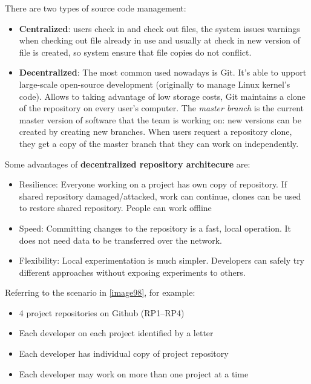 \documentclass[10pt,a4paper]{report}
\begin{document}
There are two types of source code management:
\begin{itemize}
	\item \textbf{Centralized}: users check in and check out files, the system issues warnings when checking out file already in use and usually at check in new version of file is created, so system ensure that file copies do not conflict.
	\item \textbf{Decentralized}: The most common used nowadays is Git. It's able to upport large-scale open-source development (originally to manage Linux kernel’s code). Allows to taking advantage of low storage costs, Git maintains a clone of the repository on every user’s computer.
	The \textit{master branch} is the current master version of software that the team is working on: new versions can be created by creating new branches. When users request a repository clone, they get a
	copy of the master branch that they can work on independently.
\end{itemize}
Some advantages of \textbf{decentralized repository architecure} are:
\begin{itemize}
	\item Resilience: Everyone working on a project has own copy of repository. If shared repository damaged/attacked, work can continue, clones can	be used to restore shared repository. People can work offline
	\item Speed: Committing changes to the repository is a fast, local operation. It does not need data to be transferred over the network.
	\item Flexibility: Local experimentation is much simpler. Developers can safely try different approaches without exposing experiments to others.
\end{itemize}
Referring to the scenario in \ref{image98}, for example:
\begin{itemize}
	\item 4 project repositories on Github (RP1–RP4)
	\item Each developer on each project identified by a letter
	\item Each developer has individual copy of project repository
	\item Each developer may work on more than one project at a time
\end{itemize}
\end{document}
